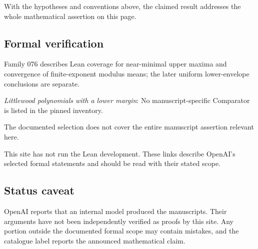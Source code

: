 \documentclass[11pt]{article}
\begin{document}
With the hypotheses and conventions above, the claimed result addresses the whole mathematical assertion on this page.

\subsection{Formal verification}
Family 076 describes Lean coverage for near-minimal upper maxima and convergence of finite-exponent modulus means; the later uniform lower-envelope conclusions are separate.

\textit{Littlewood polynomials with a lower margin}: No manuscript-specific Comparator is listed in the pinned inventory.

The documented selection does not cover the entire manuscript assertion relevant here.

This site has not run the Lean development. These links describe OpenAI’s selected formal statements and should be read with their stated scope.

\subsection{Status caveat}
OpenAI reports that an internal model produced the manuscripts. Their arguments have not been independently verified as proofs by this site. Any portion outside the documented formal scope may contain mistakes, and the catalogue label reports the announced mathematical claim.
\end{document}
